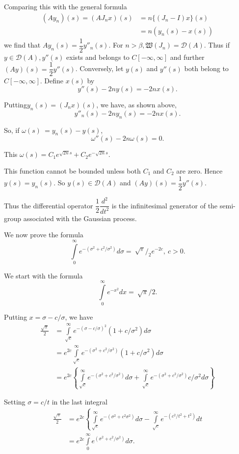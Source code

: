  Comparing this with the general formula
 \begin{align*}
  (A y_n) (s) = ( A J_n x ) (s) &= n \bigg\{ ( J_n - I ) x \bigg\}
  (s) \\ 
  &= n (y_n (s) - x (s))
 \end{align*} 
we find that $ A y_n (s) = \dfrac{1}{2} y''_n (s) $. For $ n > \beta,
\mathfrak{W} ( J_n ) = \mathscr{D} (A) $. Thus if $ y \in \mathscr{D}
(A), y'' (s) $ exists and belongs to $C [ - \infty, \infty ] $ and
further $ (Ay) (s) = \dfrac{1}{2} y'' (s)$. Conversely, let $y (s)$
and $y''(s)$ 
both belong to $ C [ - \infty, \infty ] $. Define $ x (s)
$ by 
$$
y'' (s) - 2 n y (s) = - 2 n x (s). 
$$ 
 
Putting\pageoriginale $y_n(s) = ( J_n x )(s) $, we have, as shown above, 
 $$
 y''_n (s) -2 n y_n (s) = -2 n x (s).
 $$
 
So, if $ \omega (s) ~= y_n (s) - y (s) $,
 $$
 \omega'' (s) -2n \omega (s) = 0.
 $$

This $ \omega (s) = C_1 e^{\sqrt{2 n} s} + C_2 e^{- \sqrt{2n} s}$.

This function cannot be bounded unless both $ C_1 $ and $ C_2 $ are
zero. Hence $ y (s) = y_n (s) $. So $ y (s) \in \mathscr{D} (A) $ and
$(Ay) (s) = \dfrac{1}{2} y'' (s) $. 

Thus the differential operator $ \dfrac{1}{2} \dfrac{d^2}{dt^2} $ is
the infinitesimal generator of the semi-group associated with the
Gaussian process. 

We now prove the formula
$$
\int \limits^{\infty}_{0} e^{-( \sigma^2 + c^2 / \sigma^2 )} d
\sigma = ~ \sqrt{^\pi}/_2 e^{-2c}, ~ c > 0. 
$$

We start with the formula
$$
\int \limits^{\infty}_{0} e^{-x^2} dx = ~ \sqrt{\pi} /2. 
$$

Putting $ x = \sigma - c/ \sigma $, we have
\begin{align*}
 \frac{\sqrt{\pi}}{2} &= \int \limits^{\infty}_{\sqrt{c}} e^{-(
  \sigma - c / \sigma )^2} ( 1 + c / \sigma^2 ) d \sigma \\ 
 &= e^{2 c} \int \limits^{\infty}_{\sqrt{c}} e^{-( \sigma^2 + c^2 /
  \sigma^2 )} ( 1 + c/ \sigma^2 ) d \sigma \\ 
 &= e^{2c} \left \{ \int \limits^{\infty}_{\sqrt{c}} e^{-( \sigma^2 +
  c^2 / \sigma^2)} d \sigma + \int \limits^{\infty}_{\sqrt{c}} e^{-(
  \sigma^2 + c^2 / \sigma^2 )} c / \sigma^2 d \sigma \right\}
\end{align*}

Setting $ \sigma = c / t $ in the last integral 
\begin{align*}
 \frac{\sqrt{\pi}}{2} &= e^{2c} \left\{ \int
 \limits^{\infty}_{\sqrt{c}} e^{- ( \sigma^2 + c^2 \sigma^2 )} d
 \sigma - \int \limits^{\infty}_{\sqrt{c}} e^{- ( c^2 / t^2 + t^2 )}
 dt \right.\\
 &= e^{2 c} \int \limits^{\infty}_{0} e^{( \sigma^2 + c^2 / \sigma^2
  )} d \sigma. 
\end{align*}
